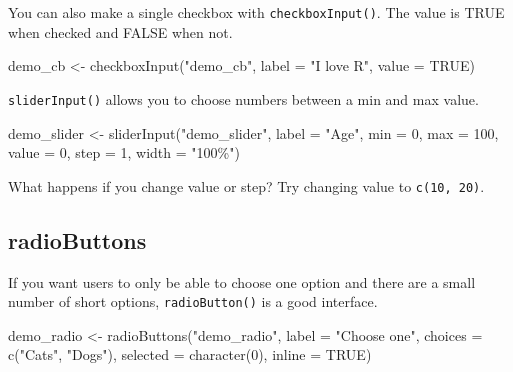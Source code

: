 \documentclass[
  oneside]{book}
\newenvironment{Shaded}{\begin{snugshade}}{\end{snugshade}}
\newcommand{\AttributeTok}[1]{\textcolor[rgb]{0.77,0.63,0.00}{#1}}
\newcommand{\ConstantTok}[1]{\textcolor[rgb]{0.00,0.00,0.00}{#1}}
\newcommand{\DecValTok}[1]{\textcolor[rgb]{0.00,0.00,0.81}{#1}}
\newcommand{\FunctionTok}[1]{\textcolor[rgb]{0.00,0.00,0.00}{#1}}
\newcommand{\NormalTok}[1]{#1}
\newcommand{\OtherTok}[1]{\textcolor[rgb]{0.56,0.35,0.01}{#1}}
\newcommand{\StringTok}[1]{\textcolor[rgb]{0.31,0.60,0.02}{#1}}
\begin{document}
You can also make a single checkbox with \texttt{checkboxInput}\texttt{()}. The \AttributeTok{value} is \ConstantTok{TRUE} when checked and \ConstantTok{FALSE} when not.

\begin{Shaded}
\begin{Highlighting}[]
\NormalTok{demo\_cb }\OtherTok{\textless{}{-}} \FunctionTok{checkboxInput}\NormalTok{(}\StringTok{"demo\_cb"}\NormalTok{, }\AttributeTok{label =} \StringTok{"I love R"}\NormalTok{, }\AttributeTok{value =} \ConstantTok{TRUE}\NormalTok{)}
\end{Highlighting}
\end{Shaded}

\texttt{sliderInput}\texttt{()} allows you to choose numbers between a \AttributeTok{min} and \AttributeTok{max} value.

\begin{Shaded}
\begin{Highlighting}[]
\NormalTok{demo\_slider }\OtherTok{\textless{}{-}} \FunctionTok{sliderInput}\NormalTok{(}\StringTok{"demo\_slider"}\NormalTok{, }\AttributeTok{label =} \StringTok{"Age"}\NormalTok{, }\AttributeTok{min =} \DecValTok{0}\NormalTok{, }\AttributeTok{max =} \DecValTok{100}\NormalTok{, }\AttributeTok{value =} \DecValTok{0}\NormalTok{,}
    \AttributeTok{step =} \DecValTok{1}\NormalTok{, }\AttributeTok{width =} \StringTok{"100\%"}\NormalTok{)}
\end{Highlighting}
\end{Shaded}

\begin{try}
What happens if you change \AttributeTok{value} or \AttributeTok{step}? Try changing \AttributeTok{value} to \texttt{c(10,\ 20)}.

\end{try}

\hypertarget{radiobuttons}{%
\subsection{radioButtons}\label{radiobuttons}}

If you want users to only be able to choose one option and there are a small number of short options, \texttt{radioButton}\texttt{()} is a good interface.

\begin{Shaded}
\begin{Highlighting}[]
\NormalTok{demo\_radio }\OtherTok{\textless{}{-}} \FunctionTok{radioButtons}\NormalTok{(}\StringTok{"demo\_radio"}\NormalTok{, }\AttributeTok{label =} \StringTok{"Choose one"}\NormalTok{, }\AttributeTok{choices =} \FunctionTok{c}\NormalTok{(}\StringTok{"Cats"}\NormalTok{,}
    \StringTok{"Dogs"}\NormalTok{), }\AttributeTok{selected =} \FunctionTok{character}\NormalTok{(}\DecValTok{0}\NormalTok{), }\AttributeTok{inline =} \ConstantTok{TRUE}\NormalTok{)}
\end{Highlighting}
\end{Shaded}
\end{document}
